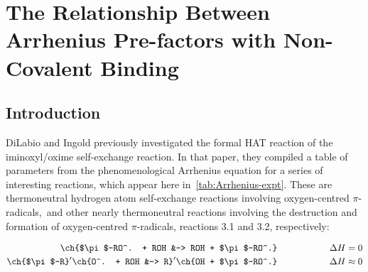 
\chapter{The Relationship Between Arrhenius Pre-factors with Non-Covalent Binding}
\label{ch:arrhenius}

\section{Introduction}


DiLabio and Ingold\cite{DiLabio2005} previously investigated the formal HAT reaction of the iminoxyl/oxime self-exchange reaction. In that paper, they compiled a table of parameters from the phenomenological Arrhenius equation for a series of interesting reactions, which appear here in~\ref{tab:Arrhenius-expt}.\cite{Kreilick1966, Mader2004, Mahoney1970, DaRooge1967, Howard1973, Foti1994, Chenier1974, Chenier1975} These are thermoneutral hydrogen atom self-exchange reactions involving oxygen-centred $\pi$-radicals,\footnotemark\ and other nearly thermoneutral reactions involving the destruction and formation of oxygen-centred $\pi$-radicals, reactions 3.1 and 3.2, respectively:

\begin{align}
  \ch{$\pi$-RO^. + ROH &-> ROH + $\pi$-RO^.} \hspace{2cm} \Delta H = 0 \\
  \ch{$\pi$-R}^\prime\ch{O^. + ROH &-> R}^\prime\ch{OH + $\pi$-RO^.} \hspace{2cm} \Delta H \approx 0
\end{align}

\newcommand{\tabFig}[2][0.35]{\texttt{[image: figures/\#2.eps]}}

